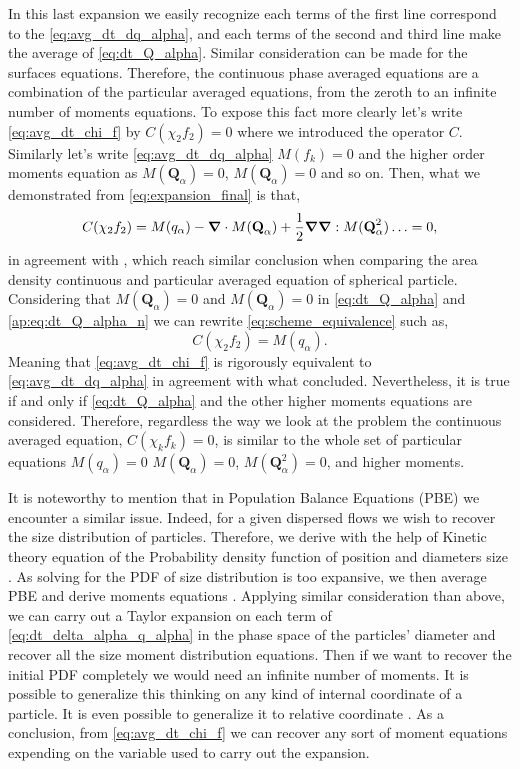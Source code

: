 In this last expansion we easily recognize each terms of the first line correspond to the \ref{eq:avg_dt_dq_alpha}, and each terms of the second and third line  make the average of \ref{eq:dt_Q_alpha}. 
Similar consideration can be made for the surfaces equations.
Therefore, the continuous phase averaged equations are a combination of the particular averaged equations, from the zeroth to an infinite number of moments equations. 
To expose this fact more clearly let's write \ref{eq:avg_dt_chi_f} by $C(\chi_2f_2) = 0$ where we introduced the operator $C$.
Similarly let's write \ref{eq:avg_dt_dq_alpha} $M(f_k) = 0$ and the higher order moments equation as  $M(\textbf{Q}_\alpha) =0$, $M(\textbf{Q}_\alpha) =0$ and so on. 
Then, what we demonstrated from \ref{eq:expansion_final} is that, 
\begin{equation}
    C(\chi_2 f_2) = M(q_\alpha) - \bm{\nabla} \cdot M(\textbf{Q}_\alpha) + \frac{1}{2} \bm{\nabla}\bm{\nabla} : M(\textbf{Q}^2_\alpha) \ldots = 0,
    \label{eq:scheme_equivalence}
\end{equation} 
in agreement with \cite{lhuillier2000bilan}, which reach similar conclusion when comparing the area density continuous and particular averaged equation of spherical particle. 
Considering that $M(\textbf{Q}_\alpha) =0$ and $M(\textbf{Q}_\alpha) =0$ in \ref{eq:dt_Q_alpha} and \ref{ap:eq:dt_Q_alpha_n} we can rewrite \ref{eq:scheme_equivalence} such as, 
\begin{equation}
    C(\chi_2 f_2) = M(q_\alpha).
\end{equation}
Meaning that \ref{eq:avg_dt_chi_f} is rigorously equivalent to \ref{eq:avg_dt_dq_alpha} in agreement with what \cite{nott2011suspension} concluded.
Nevertheless, it is true if and only if \ref{eq:dt_Q_alpha} and the other higher moments equations are considered.
Therefore, regardless the way we look at the problem the continuous averaged equation, $C(\chi_kf_k)=0$, is similar to the whole set of particular equations $M(q_\alpha) =0$ $M(\textbf{Q}_\alpha) =0$, $M(\textbf{Q}^2_\alpha) =0$, and higher moments. 

It is noteworthy to mention that in Population Balance Equations (PBE) we encounter a similar issue. 
Indeed, for a given dispersed flows we wish to recover the size distribution of particles.
Therefore, we derive with the help of Kinetic theory equation of the Probability density function of position and diameters size \citet{randolph2012theory}. 
As solving for the PDF of size distribution is too expansive,  we then average PBE and derive moments equations \citep{fox2022hyperbolic}. 
Applying similar consideration than above, we can carry out a Taylor expansion on each term of \ref{eq:dt_delta_alpha_q_alpha} in the phase space of the particles' diameter and recover all the size moment distribution equations. 
Then if we want to recover the initial PDF completely we would need an infinite number of moments. 
It is possible to generalize this thinking on any kind of internal coordinate of a particle.
It is even possible to generalize it to relative coordinate \citet{zhang2021ensemble}.   
As a conclusion, from \ref{eq:avg_dt_chi_f} we can recover any sort of moment equations expending on the variable used to carry out the expansion. 

